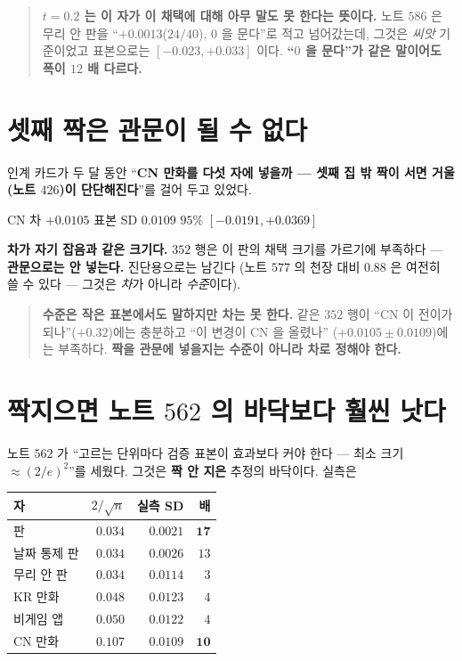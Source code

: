 \documentclass[11pt]{article}
\begin{document}
\begin{quote}
\textbf{$t{=}0.2$ 는 이 자가 이 채택에 대해 아무 말도 못 한다는 뜻이다.}
노트 $586$ 은 무리 안 판을 ``$+0.0013$($24/40$), $0$ 을 문다''로 적고
넘어갔는데, 그것은 \emph{씨앗} 기준이었고 표본으로는 $[-0.023, +0.033]$
이다. \textbf{``$0$ 을 문다''가 같은 말이어도 폭이 $12$ 배 다르다.}
\end{quote}

\section{셋째 짝은 관문이 될 수 없다}

인계 카드가 두 달 동안 ``\textbf{CN 만화를 다섯 자에 넣을까 --- 셋째 집 밖
짝이 서면 거울(노트 $426$)이 단단해진다}''를 걸어 두고 있었다.

\begin{center}
CN 차 $+0.0105$ \quad 표본 SD $\mathbf{0.0109}$ \quad $95\%$
$[-0.0191, +0.0369]$
\end{center}

\textbf{차가 자기 잡음과 같은 크기다.} $352$ 행은 이 판의 채택 크기를
가르기에 부족하다 --- \textbf{관문으로는 안 넣는다.} 진단용으로는 남긴다
(노트 $577$ 의 천장 대비 $0.88$ 은 여전히 쓸 수 있다 --- 그것은 \emph{차}가
아니라 \emph{수준}이다).

\begin{quote}
\textbf{수준은 작은 표본에서도 말하지만 차는 못 한다.} 같은 $352$ 행이
``CN 이 전이가 되나''($+0.32$)에는 충분하고 ``이 변경이 CN 을 올렸나''
($+0.0105 \pm 0.0109$)에는 부족하다. \textbf{짝을 관문에 넣을지는 수준이
아니라 차로 정해야 한다.}
\end{quote}

\section{짝지으면 노트 $562$ 의 바닥보다 훨씬 낫다}

노트 $562$ 가 ``고르는 단위마다 검증 표본이 효과보다 커야 한다 --- 최소
크기 $\approx (2/e)^2$''를 세웠다. 그것은 \textbf{짝 안 지은} 추정의
바닥이다. 실측은

\begin{center}
\begin{tabular}{lrrr}
\hline
자 & $2/\sqrt{n}$ & 실측 SD & 배 \\
\hline
판 & $0.034$ & $0.0021$ & $\mathbf{17}$ \\
날짜 통제 판 & $0.034$ & $0.0026$ & $13$ \\
무리 안 판 & $0.034$ & $0.0114$ & $3$ \\
KR 만화 & $0.048$ & $0.0123$ & $4$ \\
비게임 앱 & $0.050$ & $0.0122$ & $4$ \\
CN 만화 & $0.107$ & $0.0109$ & $\mathbf{10}$ \\
\hline
\end{tabular}
\end{center}
\end{document}
